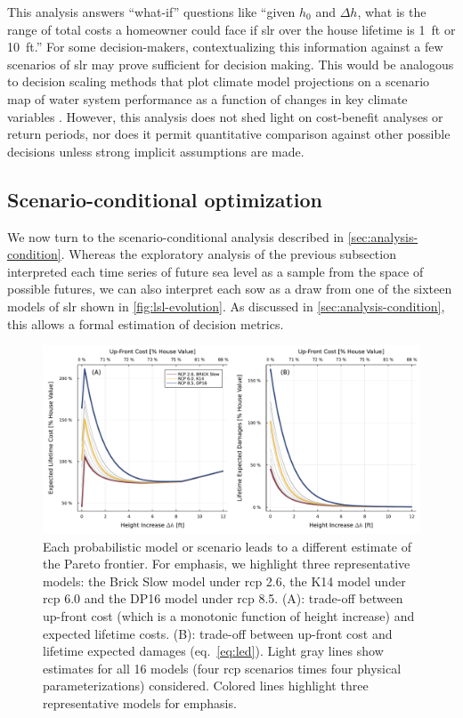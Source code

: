 \documentclass[11pt]{article}
\makeatletter
\DeclareRobustCommand\onedot{\futurelet\@let@token\@onedot}
\def\@onedot{\ifx\@let@token.\else.\null\fi\xspace}
\def\eg{\emph{e.g}\onedot} \def\Eg{\emph{E.g}\onedot}
\DeclareRobustCommand\onedot{\futurelet\@let@token\@onedot}
\def\@onedot{\ifx\@let@token.\else.\null\fi\xspace}
\def\eg{\emph{e.g}\onedot} \def\Eg{\emph{E.g}\onedot}
\makeatother
\begin{document}
This analysis answers ``what-if'' questions like ``given $h_0$ and $\Delta h$, what is the range of total costs a homeowner could face if \gls{slr} over the house lifetime is \SI{1}{ft} or \SI{10}{ft}.''
For some decision-makers, contextualizing this information against a few scenarios of \gls{slr} \citep[\eg, those of][]{sweet_slr:2022} may prove sufficient for decision making.
This would be analogous to decision scaling methods that plot climate model projections on a scenario map of water system performance as a function of changes in key climate variables \citep{Brown:2012kb,Steinschneider:2015kk}.
However, this analysis does not shed light on cost-benefit analyses or return periods, nor does it permit quantitative comparison against other possible decisions unless strong implicit assumptions are made.

\subsection{Scenario-conditional optimization}\label{sec:results-conditional}

We now turn to the scenario-conditional analysis described in \cref{sec:analysis-condition}.
Whereas the exploratory analysis of the previous subsection interpreted each time series of future sea level as a sample from the space of possible futures, we can also interpret each \gls{sow} as a draw from one of the sixteen models of \gls{slr} shown in \cref{fig:lsl-evolution}.
As discussed in \cref{sec:analysis-condition}, this allows a formal estimation of decision metrics.

\begin{figure}
    \centering
    \includegraphics[width=\textwidth]{tradeoffs-by-rcp}
    \caption{
        Each probabilistic model or scenario leads to a different estimate of the Pareto frontier.
        For emphasis, we highlight three representative models: the Brick Slow model \citep{wong_brick0.2:2017} under \gls{rcp} 2.6, the K14 \citep{kopp_probabilistic:2014} model under \gls{rcp} 6.0 and the DP16 model \citep{deconto_antarctica:2016,kopp_evolving:2017} under \gls{rcp} 8.5.
        (A): trade-off between up-front cost (which is a monotonic function of height increase) and expected lifetime costs.
        (B): trade-off between up-front cost and lifetime expected damages (eq.~\ref{eq:led}).
        Light gray lines show estimates for all 16 models (four \gls{rcp} scenarios times four physical parameterizations) considered.
        Colored lines highlight three representative models for emphasis.
    }\label{fig:tradeoffs-by-rcp}
\end{figure}
\end{document}
